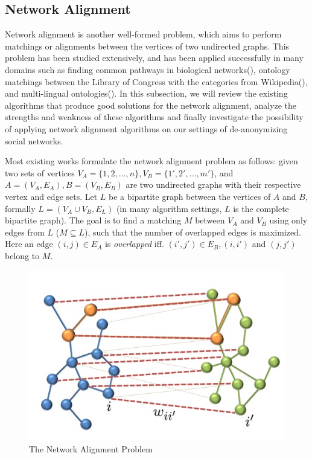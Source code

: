\documentclass[11pt,letterpaper]{article}
\begin{document}
\subsection{Network Alignment}
Network alignment is another well-formed problem, which aims to perform matchings or alignments between the vertices of two undirected graphs. This problem has been studied extensively, and has been applied successfully in many domains such as finding common pathways in biological networks(\cite{Singh2007, Singh2008, Liao2009}), ontology matchings between the Library of Congress with the categories from Wikipedia(\cite{Bayati2009}), and multi-lingual ontologies(\cite{Kreitmann2011, Bayati2009a}). In this subsection, we will review the existing algorithms that produce good solutions for the network alignment, analyze the strengths and weakness of these algorithms and finally investigate the possibility of applying network alignment algorithms on our settings of de-anonymizing social networks.
 
Most existing works formulate the network alignment problem as follows: given two sets of vertices $V_A = \{1, 2, \ldots, n\}, V_B = \{1', 2', \ldots, m'\}$, and $A = (V_A, E_A), B = (V_B, E_B)$ are two undirected graphs with their respective vertex and edge sets. Let $L$ be a bipartite graph between the vertices of $A$ and $B$, formally $L = (V_A \cup V_B, E_L)$ (in many algorithm settings, $L$ is the complete bipartite graph). The goal is to find a matching $M$ between $V_A$ and $V_B$ using only edges from $L$ ($M \subseteq L$), such that the number of overlapped edges is maximized. Here an edge $(i, j) \in E_A$ is \textit{overlapped} iff. $(i', j') \in E_B, (i, i')$ and $(j, j')$ belong to $M$.


\begin{figure}[!h]
\begin{center}
\includegraphics[scale = 0.5]{fig/matching}
\caption{The Network Alignment Problem}
\end{center}
\end{figure}
\end{document}
